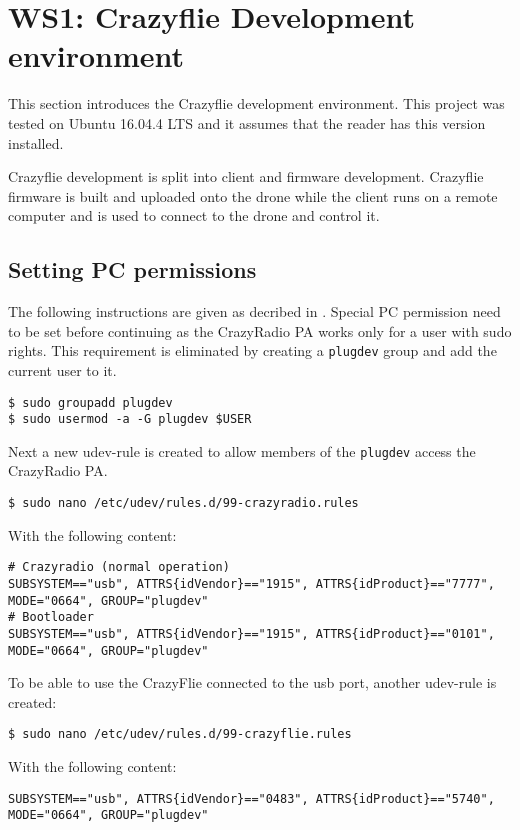 \section{WS1: Crazyflie Development environment}
This section introduces the Crazyflie development environment. This project was tested on Ubuntu 16.04.4 LTS and it assumes that the reader has this version installed.

\noindent Crazyflie development is split into client and firmware development. Crazyflie firmware is built and uploaded onto the drone while the client runs on a remote computer and is used to connect to the drone and control it.

\subsection{Setting PC permissions}
The following instructions are given as decribed in \cite{book_ros}.
Special PC permission need to be set before continuing as the CrazyRadio PA works only for a user with sudo rights. This requirement is eliminated by creating a \texttt{plugdev} group and add the current user to it.
\begin{mdframed}[backgroundcolor=light-gray, linecolor=light-gray]
  \texttt{\$ sudo groupadd plugdev}\\
  \texttt{\$ sudo usermod -a -G plugdev \$USER}
\end{mdframed}

\noindent Next a new udev-rule is created to allow members of the \texttt{plugdev} access the CrazyRadio PA.
\begin{mdframed}[backgroundcolor=light-gray, linecolor=light-gray]
  \texttt{\$ sudo nano /etc/udev/rules.d/99-crazyradio.rules}
\end{mdframed}

\noindent With the following content:
\begin{verbatim}
# Crazyradio (normal operation)
SUBSYSTEM=="usb", ATTRS{idVendor}=="1915", ATTRS{idProduct}=="7777", MODE="0664", GROUP="plugdev"
# Bootloader
SUBSYSTEM=="usb", ATTRS{idVendor}=="1915", ATTRS{idProduct}=="0101", MODE="0664", GROUP="plugdev"
\end{verbatim}

\noindent To be able to use the CrazyFlie connected to the usb port, another udev-rule is created:
\begin{mdframed}[backgroundcolor=light-gray, linecolor=light-gray]
  \texttt{\$ sudo nano /etc/udev/rules.d/99-crazyflie.rules}
\end{mdframed}
With the following content:
\begin{verbatim}
SUBSYSTEM=="usb", ATTRS{idVendor}=="0483", ATTRS{idProduct}=="5740", MODE="0664", GROUP="plugdev"
\end{verbatim}

